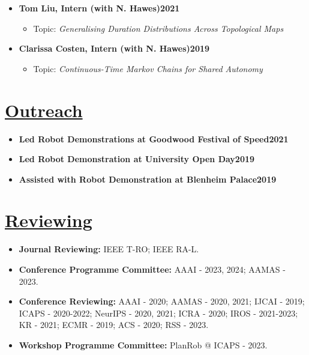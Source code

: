\documentclass[11pt]{article}
\begin{document}
\begin{itemize}
\begin{itemize}
\end{itemize}
\item \textbf{Tom Liu, Intern (with N. Hawes)\hfill 2021}
\begin{itemize}
\item Topic: \emph{Generalising Duration Distributions Across Topological Maps}
\end{itemize}
\item \textbf{Clarissa Costen, Intern (with N. Hawes)\hfill 2019}
\begin{itemize}
\item Topic: \emph{Continuous-Time Markov Chains for Shared Autonomy}
\end{itemize}
\end{itemize}

\vspace{-10pt}
\section*{\uline{Outreach\hfill}}
\vspace{-5pt}
\begin{itemize}
\item \textbf{Led Robot Demonstrations at Goodwood Festival of Speed\hfill 2021}
\item \textbf{Led Robot Demonstration at University Open Day\hfill 2019}
\item \textbf{Assisted with Robot Demonstration at Blenheim Palace\hfill 2019}
\end{itemize}



\vspace{-10pt}
\section*{\uline{Reviewing\hfill}}
\vspace{-5pt}
\begin{itemize}
\item \textbf{Journal Reviewing:} IEEE T-RO; IEEE RA-L.
\item \textbf{Conference Programme Committee:}  AAAI - 2023, 2024; AAMAS - 2023.
\item \textbf{Conference Reviewing:} AAAI - 2020; AAMAS - 2020, 2021; IJCAI - 2019; ICAPS - 2020-2022; NeurIPS - 2020, 2021; ICRA - 2020; IROS - 2021-2023; KR - 2021; ECMR - 2019; ACS - 2020; RSS - 2023.
\item\textbf{Workshop Programme Committee:} PlanRob @ ICAPS - 2023.
\end{itemize}
\end{document}
